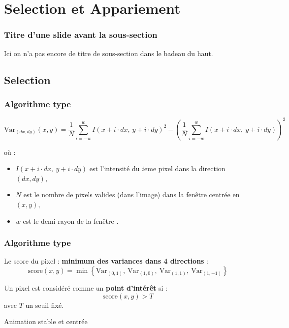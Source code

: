 \section[Selection et Appariement]{Selection et Appariement}
\begin{frame}
\frametitle{Titre d'une slide avant la sous-section\esp}
	Ici on n'a pas encore de titre de sous-section dans le badeau du haut.
	\label{slides_hors_subsec}
\end{frame}


\subsection{Selection}
\begin{frame}
\frametitle{Algorithme type }
\[
\mathrm{Var}_{(dx, dy)}(x, y) = \frac{1}{N} \sum_{i=-w}^{w} I(x + i \cdot dx,\ y + i \cdot dy)^2 - \left( \frac{1}{N} \sum_{i=-w}^{w} I(x + i \cdot dx,\ y + i \cdot dy) \right)^2
\]

où :
\begin{itemize}
  \item $I(x + i \cdot dx,\ y + i \cdot dy)$ est l’intensité du $i$eme pixel dans la direction $(dx, dy)$,
  \item $N$ est le nombre de pixels valides (dans l’image) dans la fenêtre centrée en $(x, y)$,
  \item $w$ est le demi-rayon de la fenêtre .
\end{itemize}
\end{frame}
\begin{frame}
\frametitle{Algorithme type }

\vspace{0.5em}
Le score du pixel : \textbf{minimum des variances dans 4 directions} :
\[
\text{score}(x, y) = \min \left\{ \mathrm{Var}_{(0,1)},\ \mathrm{Var}_{(1,0)},\ \mathrm{Var}_{(1,1)},\ \mathrm{Var}_{(1,-1)} \right\}
\]

Un pixel est considéré comme un \textbf{point d’intérêt} si :
\[
\text{score}(x, y) > T
\]
avec $T$ un seuil fixé.
\end{frame}


\begin{frame}{Animation stable et centrée}
  \begin{center}
  \end{center}
\end{frame}

